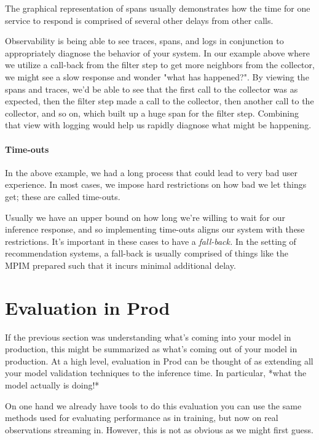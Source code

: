 The graphical representation of spans usually demonstrates how the time for one service to respond is comprised of several other delays from other calls. 

Observability is being able to see traces, spans, and logs in conjunction to appropriately diagnose the behavior of your system. In our example above where we utilize a call-back from the filter step to get more neighbors from the collector, we might see a slow response and wonder "what has happened?". By viewing the spans and traces, we'd be able to see that the first call to the collector was as expected, then the filter step made a call to the collector, then another call to the collector, and so on, which built up a huge span for the filter step. Combining that view with logging would help us rapidly diagnose what might be happening.

\paragraph{Time-outs}

In the above example, we had a long process that could lead to very bad user experience. In most cases, we impose hard restrictions on how bad we let things get; these are called time-outs. 

Usually we have an upper bound on how long we're willing to wait for our inference response, and so implementing time-outs aligns our system with these restrictions. It's important in these cases to have a \emph{fall-back.} In the setting of recommendation systems, a fall-back is usually comprised of things like the MPIM prepared such that it incurs minimal additional delay. 

\section{Evaluation in Prod}

If the previous section was understanding what's coming into your model in production, this might be summarized as what's coming out of your model in production. At a high level, evaluation in Prod can be thought of as extending all your model validation techniques to the inference time. In particular, *what the model actually is doing!*

On one hand we already have tools to do this evaluation \textemdash you can use the same methods used for evaluating performance as in training, but now on real observations streaming in. However, this is not as obvious as we might first guess.

